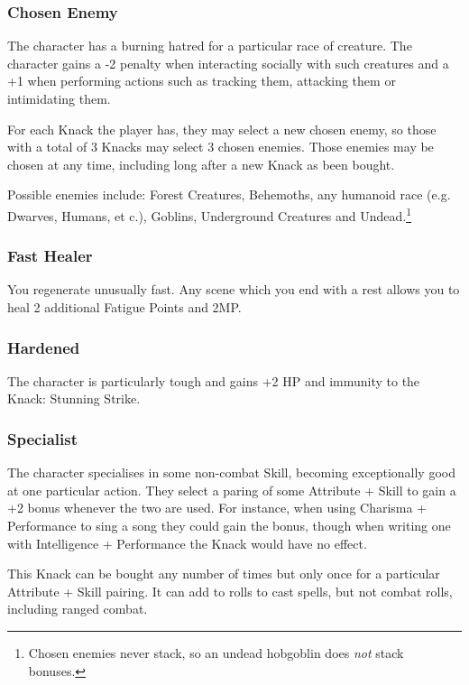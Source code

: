 \begin{multicols}{2}

\subsubsection{Chosen Enemy}

The character has a burning hatred for a particular race of creature. The character gains a -2 penalty when interacting socially with such creatures and a +1 when performing actions such as tracking them, attacking them or intimidating them.

For each Knack the player has, they may select a new chosen enemy, so those with a total of 3 Knacks may select 3 chosen enemies. Those enemies may be chosen at any time, including long after a new Knack as been bought.

Possible enemies include: Forest Creatures, Behemoths, any humanoid race (e.g. Dwarves, Humans, et c.), Goblins, Underground Creatures and Undead.\footnote{Chosen enemies never stack, so an undead hobgoblin does \emph{not} stack bonuses.}

\subsubsection{Fast Healer}

You regenerate unusually fast. Any scene which you end with a rest allows you to heal 2 additional Fatigue Points and 2MP.

\subsubsection{Hardened}

The character is particularly tough and gains +2 HP and immunity to the Knack: Stunning Strike.

\subsubsection{Specialist}

The character specialises in some non-combat Skill, becoming exceptionally good at one particular action. They select a paring of some Attribute + Skill to gain a +2 bonus whenever the two are used. For instance, when using Charisma + Performance to sing a song they could gain the bonus, though when writing one with Intelligence + Performance the Knack would have no effect.

This Knack can be bought any number of times but only once for a particular Attribute + Skill pairing. It can add to rolls to cast spells, but not combat rolls, including ranged combat.

\end{multicols}


